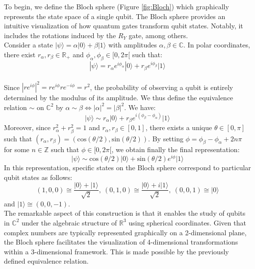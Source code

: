 To begin, we define the Bloch sphere (Figure \ref{fig:Bloch}) which graphically represents the state space of a single qubit. The Bloch sphere provides an intuitive visualization of how quantum gates transform qubit states. Notably, it includes the rotations induced by the $R_Y$ gate, among others.
\\[5pt]
Consider a state $|\psi \rangle =\alpha |0\rangle +\beta |1\rangle$ with amplitudes $\alpha ,\beta \in \mathbb{C}$. In polar coordinates, there exist $r_{\alpha}, r_{\beta} \in \mathbb{R}_+$ and $\phi_{\alpha}, \phi_{\beta} \in [0,2\pi[$ such that:
\[|\psi \rangle = r_{\alpha}e^{i\phi_{\alpha}}|0\rangle + r_{\beta}e^{i\phi_{\beta}} |1\rangle\]
\\[5pt]
Since $|re^{i\phi}|^2 = re^{i\phi}re^{-i\phi} = r^2$, the probability of observing a qubit is entirely determined by the modulus of its amplitude. We thus define the equivalence relation $\sim$ on $\mathbb{C}^2$ by $\alpha \sim \beta \iff |\alpha|^2=|\beta|^2$. We have:
\[|\psi \rangle \sim r_{\alpha}|0\rangle + r_{\beta}e^{i(\phi_{\beta}-\phi_{\alpha})} |1\rangle\]
Moreover, since $r_{\alpha}^2+r_{\beta}^2=1$ and $r_{\alpha}, r_{\beta} \in [0,1]$, there exists a unique $\theta \in [0,\pi]$ such that $(r_{\alpha}, r_{\beta}) = (\mathrm{cos}(\theta/2),\mathrm{sin}(\theta/2))$. By setting $\phi = \phi_{\beta}-\phi_{\alpha} + 2n\pi$ for some $n \in \mathbb{Z}$ such that $\phi \in [0,2\pi[$, we obtain finally the final representation:
\[|\psi \rangle \sim \mathrm{cos}(\theta/2)|0\rangle + \mathrm{sin}(\theta/2)e^{i\phi}|1\rangle\]
In this representation, specific states on the Bloch sphere correspond to particular qubit states as follows:
\[(1,0,0) \cong \frac{|0\rangle+|1\rangle}{\sqrt{2}}, \ (0,1,0) \cong \frac{|0\rangle+i|1\rangle}{\sqrt{2}}, \ (0,0,1) \cong |0\rangle\]
and $|1\rangle \cong (0,0,-1)$.
\\[5pt]
The remarkable aspect of this construction is that it enables the study of qubits in $\mathbb{C}^2$ under the algebraic structure of $\mathbb{R}^3$ using spherical coordinates. Given that complex numbers are typically represented graphically on a 2-dimensional plane, the Bloch sphere facilitates the visualization of 4-dimensional transformations within a 3-dimensional framework. This is made possible by the previously defined equivalence relation.

